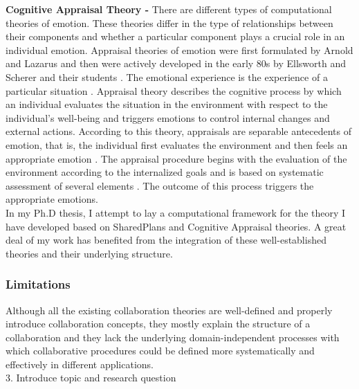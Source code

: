 \documentclass[a4paper, 10pt]{article}
\begin{document}
\begin{small}
\textbf{Cognitive Appraisal Theory -} There are different types of computational
theories of emotion. These theories differ in the type of relationships between
their components and whether a particular component plays a crucial role in an
individual emotion. Appraisal theories of emotion were first formulated by Arnold
\cite{arnold:emotion-personality} and Lazarus \cite{lazarus:emotion-adaptation}
and then were actively developed in the early 80s by Ellsworth and Scherer and
their students \cite{roseman:appraisal-theory,
sander:systems-approach-appraisal, scherer:nature-function-emotion,
scherer:emotions-emergent, scherer:appraisal-processes}. The emotional
experience is the experience of a particular situation \cite{frijda:emotions}.
Appraisal theory describes the cognitive process by which an individual
evaluates the situation in the environment with respect to the individual's
well-being and triggers emotions to control internal changes and external
actions. According to this theory, appraisals are separable antecedents of
emotion, that is, the individual first evaluates the environment and then feels
an appropriate emotion \cite{scherer:appraisal-processes}. The appraisal
procedure begins with the evaluation of the environment according to the
internalized goals and is based on systematic assessment of several elements
\cite{scherer:sequential-appraisal-process}. The outcome of this process
triggers the appropriate emotions.\\


In my Ph.D thesis, I attempt to lay a computational framework for the theory I
have developed based on SharedPlans and Cognitive Appraisal theories. A great
deal of my work has benefited from the integration of these well-established
theories and their underlying structure.

\subsubsection*{Limitations}

Although all the existing collaboration theories are well-defined and properly
introduce collaboration concepts, they mostly explain the structure of a
collaboration and they lack the underlying domain-independent processes with
which collaborative procedures could be defined more systematically and
effectively in different applications.\\

3. Introduce topic and research question \\


\end{small}
\end{document}
